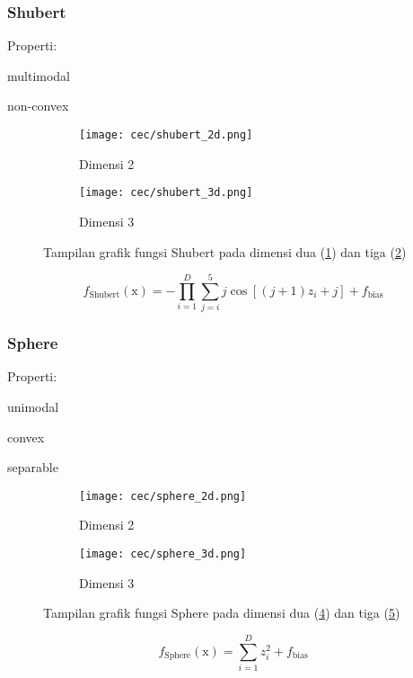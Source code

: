 \subsubsection*{Shubert}
\noindent Properti:
\begin{packed_item}
  \item multimodal
  \item non-convex
\end{packed_item}
\begin{figure}[H]
	\centering
	\begin{subfigure}[b]{0.4\textwidth}
		\centering
		\texttt{[image: cec/shubert\_2d.png]}
		\caption{Dimensi 2}
		\label{fig:shubert-2d}
	\end{subfigure}
	\hfill
	\begin{subfigure}[b]{0.4\textwidth}
		\centering
		\texttt{[image: cec/shubert\_3d.png]}
		\caption{Dimensi 3}
		\label{fig:shubert-3d}
	\end{subfigure}
	\caption{Tampilan grafik fungsi Shubert pada dimensi dua (\cref{fig:shubert-2d}) dan tiga (\cref{fig:shubert-3d})}
	\label{fig:shubert}
\end{figure}
\begin{equation}
  f_{\text{Shubert}}(\mathrm{x})=-\prod_{i=1}^{D}\sum_{j=i}^{5}j\cos\left[\left(j+1 \right)z_i+j  \right]  +f_{\text{bias}}
\end{equation}

\subsubsection*{Sphere}
\noindent Properti:
\begin{packed_item}
  \item unimodal
  \item convex
  \item separable
\end{packed_item}
\begin{figure}[H]
	\centering
	\begin{subfigure}[b]{0.4\textwidth}
		\centering
		\texttt{[image: cec/sphere\_2d.png]}
		\caption{Dimensi 2}
		\label{fig:sphere-2d}
	\end{subfigure}
	\hfill
	\begin{subfigure}[b]{0.4\textwidth}
		\centering
		\texttt{[image: cec/sphere\_3d.png]}
		\caption{Dimensi 3}
		\label{fig:sphere-3d}
	\end{subfigure}
	\caption{Tampilan grafik fungsi Sphere pada dimensi dua (\cref{fig:sphere-2d}) dan tiga (\cref{fig:sphere-3d})}
	\label{fig:sphere}
\end{figure}
\begin{equation}
  f_{\text{Sphere}}(\mathrm{x})=\sum_{i=1}^{D}z_i^2+f_{\text{bias}}
\end{equation}

